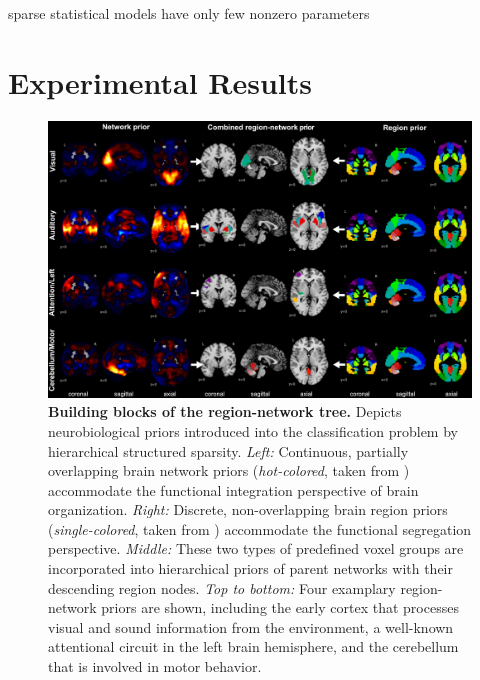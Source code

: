 \documentclass{article} %
\begin{document}
sparse statistical models have only few nonzero parameters








\section{Experimental Results}


\begin{figure}
\begin{centering}
\includegraphics[width=1.00\textwidth]{figures/reg_net_prior_colin.pdf}
\end{centering}
\vspace{-0.6cm}
\caption{\textbf{Building blocks of the region-network tree.}
Depicts neurobiological priors introduced into the classification problem 
by hierarchical structured sparsity.
\textit{Left:} Continuous, partially overlapping brain network priors
(\textit{hot-colored}, taken from \cite{smith2009})
accommodate the functional integration
perspective of brain organization.
\textit{Right:} Discrete, non-overlapping brain region priors
(\textit{single-colored}, taken from \cite{crad12})
accommodate the functional segregation perspective.
\textit{Middle:} These two types of predefined voxel groups are incorporated
into hierarchical priors of parent networks with their
descending region nodes.
\textit{Top to bottom:} Four examplary region-network priors
are shown, including
the early cortex that processes
visual and sound information from the environment,
a well-known attentional circuit in the left brain hemisphere,
and
the cerebellum that is involved in motor behavior.
}
\label{fig_priors}
\end{figure}
\end{document}
